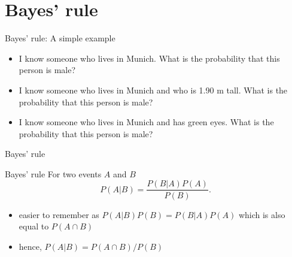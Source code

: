 \documentclass[bigger]{beamer}
\begin{document}
\section{Bayes' rule}
\label{sec:org28df2d3}
\begin{frame}[label={sec:orgc8ba334}]{Bayes' rule: A simple example}
\begin{itemize}
\item I know someone who lives in Munich. What is the probability that this person is male?
\item I know someone who lives in Munich and who is 1.90 m tall. What is the probability that this person is male?
\item I know someone who lives in Munich and has green eyes. What is the probability that this person is male?
\end{itemize}
\end{frame}
\begin{frame}[label={sec:org8165c6a}]{Bayes' rule}
\begin{block}{Bayes' rule}
For two events \(A\) and \(B\)
$$P(A|B)=\frac{P(B|A) P(A)}{P(B)}.$$
\end{block}

\begin{itemize}
\item easier to remember as \(P(A|B)P(B)=P(B|A)P(A)\) which is also equal to \(P(A\cap B)\)
\item hence, \(P(A|B)=P(A\cap B)/P(B)\)
\end{itemize}

\begin{figure}   
\end{figure}
\end{frame}
\end{document}

